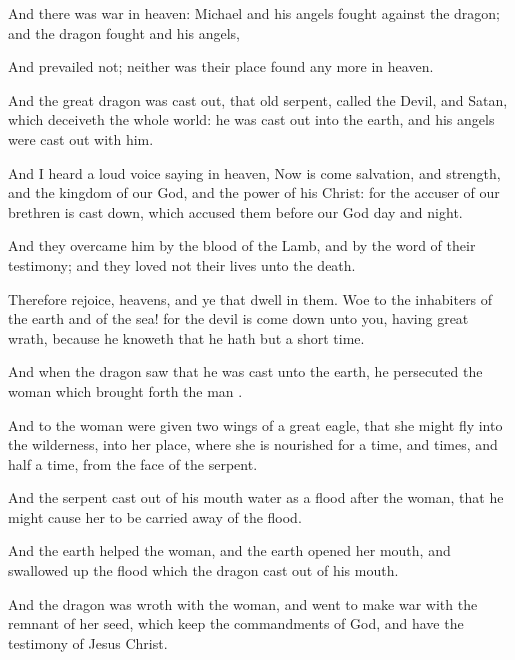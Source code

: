 {And there
was
war
in
heaven:
Michael
and
his
angels
fought
against the
dragon;
and the
dragon
fought
and
his
angels,

And
prevailed
not;
neither
was
their
place
found any
more
in
heaven.

And the
great
dragon was cast
out, that
old
serpent,
called the
Devil,
and
Satan, which
deceiveth the
whole
world: he was cast
out
into the
earth,
and
his
angels were cast
out
with
him.

And I
heard a
loud
voice
saying
in
heaven,
Now is
come
salvation,
and
strength,
and the
kingdom of
our
God,
and the
power of
his
Christ:
for the
accuser of
our
brethren is cast
down,
which
accused
them
before
our
God
day
and
night.

And
they
overcame
him
by the
blood of the
Lamb,
and
by the
word of
their
testimony;
and they
loved
not
their
lives
unto the
death.

Therefore
rejoice,
{}
heavens,
and
ye that
dwell
in
them.
Woe to the
inhabiters of the
earth
and of the
sea!
for the
devil is come
down
unto
you,
having
great
wrath,
because he knoweth
that he
hath but a
short
time.

And
when the
dragon
saw
that he was
cast
unto the
earth, he
persecuted the
woman
which brought
forth the
man
{}.

And to the
woman were
given
two
wings of a
great
eagle,
that she might
fly
into the
wilderness,
into
her
place,
where she is
nourished
for a
time,
and
times,
and
half a
time,
from the
face of the
serpent.

And the
serpent cast
out
of
his
mouth
water
as a
flood
after the
woman,
that he might
cause
her to be carried away of the
flood.

And the
earth
helped the
woman,
and the
earth
opened
her
mouth,
and swallowed
up the
flood
which the
dragon cast
out
of
his
mouth.

And the
dragon was
wroth
with the
woman,
and
went to
make
war
with the
remnant of
her
seed,
which
keep the
commandments of
God,
and
have the
testimony of
Jesus
Christ.




\par }
